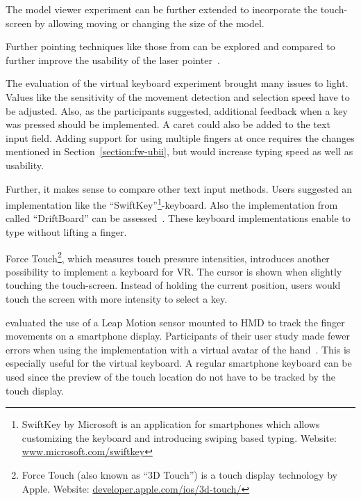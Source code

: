The model viewer experiment can be further extended to incorporate the touch-screen by allowing moving or changing the size of the model.

Further pointing techniques like those from \citeauthor{Argelaguet.2013} can be explored and compared to further improve the usability of the laser pointer~\cite[123]{Argelaguet.2013}.

The evaluation of the virtual keyboard experiment brought many issues to light. 
Values like the sensitivity of the movement detection and selection speed have to be adjusted. Also, as the participants suggested, additional feedback when a key was pressed should be implemented. A caret could also be added to the text input field. Adding support for using multiple fingers at once requires the changes mentioned in Section~\ref{section:fw-ubii}, but would increase typing speed as well as usability.

Further, it makes sense to compare other text input methods. Users suggested an implementation like the \enquote{SwiftKey}\footnote{SwiftKey by Microsoft is an application for smartphones which allows customizing the keyboard and introducing swiping based typing. Website: \href{https://www.microsoft.com/swiftkey}{www.microsoft.com/swiftkey}}-keyboard. Also the implementation from \citeauthor{Shibata.2016} called \enquote{DriftBoard} can be assessed~\cite{Shibata.2016}. These keyboard implementations enable to type without lifting a finger. 

Force Touch\footnote{Force Touch (also known as \enquote{3D Touch}) is a touch display technology by Apple. Website: \href{https://developer.apple.com/ios/3d-touch/}{developer.apple.com/ios/3d-touch/}}, which measures touch pressure intensities, introduces another possibility to implement a keyboard for \gls{VR}. The cursor is shown when slightly touching the touch-screen. Instead of holding the current position, users would touch the screen with more intensity to select a key. 

\citeauthor{Afonso.2017} evaluated the use of a Leap Motion sensor mounted to \gls{HMD} to track the finger movements on a smartphone display. Participants of their user study made fewer errors when using the implementation with a virtual avatar of the hand~\cite[247\psq]{Afonso.2017}. This is especially useful for the virtual keyboard. A regular smartphone keyboard can be used since the preview of the touch location do not have to be tracked by the touch display.

